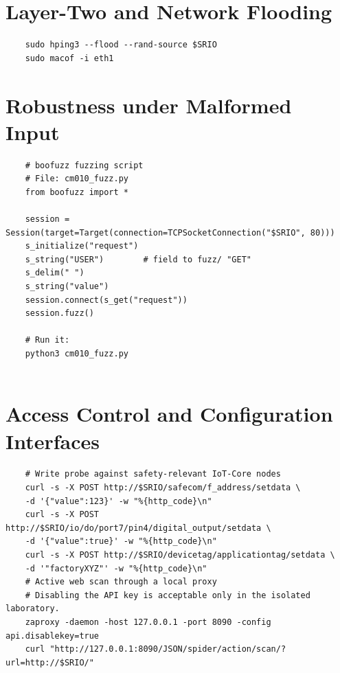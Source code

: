 \section{Layer-Two and Network Flooding}
\label{app:cmd_flood}
\begin{verbatim}
	sudo hping3 --flood --rand-source $SRIO
	sudo macof -i eth1
\end{verbatim}

\section{Robustness under Malformed Input}
\label{app:cmd_robustness}
\begin{verbatim}
	# boofuzz fuzzing script 
	# File: cm010_fuzz.py
	from boofuzz import *
	
	session = Session(target=Target(connection=TCPSocketConnection("$SRIO", 80)))
	s_initialize("request")
	s_string("USER")        # field to fuzz/ "GET"
	s_delim(" ")
	s_string("value")
	session.connect(s_get("request"))
	session.fuzz()
	
	# Run it:
	python3 cm010_fuzz.py
	
\end{verbatim}

\section{Access Control and Configuration Interfaces}
\label{app:cmd_access}
\begin{verbatim}
	# Write probe against safety-relevant IoT-Core nodes
	curl -s -X POST http://$SRIO/safecom/f_address/setdata \
	-d '{"value":123}' -w "%{http_code}\n"
	curl -s -X POST http://$SRIO/io/do/port7/pin4/digital_output/setdata \
	-d '{"value":true}' -w "%{http_code}\n"
	curl -s -X POST http://$SRIO/devicetag/applicationtag/setdata \
	-d '"factoryXYZ"' -w "%{http_code}\n"
	# Active web scan through a local proxy
	# Disabling the API key is acceptable only in the isolated laboratory.
	zaproxy -daemon -host 127.0.0.1 -port 8090 -config api.disablekey=true
	curl "http://127.0.0.1:8090/JSON/spider/action/scan/?url=http://$SRIO/"
\end{verbatim}
